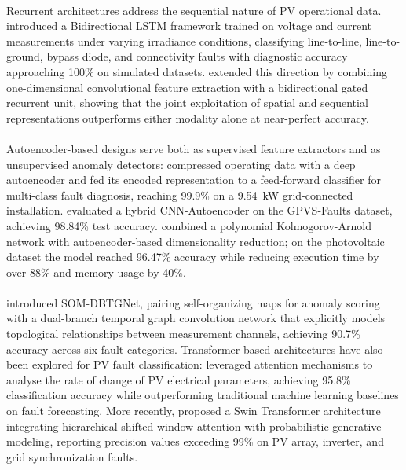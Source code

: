\paragraph{}
Recurrent architectures address the sequential nature of PV operational data. \citet{hajji2023irradiance} introduced a Bidirectional LSTM framework trained on voltage and current measurements under varying irradiance conditions, classifying line-to-line, line-to-ground, bypass diode, and connectivity faults with diagnostic accuracy approaching 100\% on simulated datasets. \citet{amiri2024dl} extended this direction by combining one-dimensional convolutional feature extraction with a bidirectional gated recurrent unit, showing that the joint exploitation of spatial and sequential representations outperforms either modality alone at near-perfect accuracy.

\paragraph{}
Autoencoder-based designs serve both as supervised feature extractors and as unsupervised anomaly detectors: \citet{seghiour2023autoencoder} compressed operating data with a deep autoencoder and fed its encoded representation to a feed-forward classifier for multi-class fault diagnosis, reaching 99.9\% on a 9.54~kW grid-connected installation. \citet{titouni_hybrid_2025} evaluated a hybrid CNN-Autoencoder on the GPVS-Faults dataset, achieving 98.84\% test accuracy. \citet{attouri_adaptive_2026} combined a polynomial Kolmogorov-Arnold network with autoencoder-based dimensionality reduction; on the photovoltaic dataset the model reached 96.47\% accuracy while reducing execution time by over 88\% and memory usage by 40\%.

\paragraph{}
\citet{yan_som-dbtgnet_2025} introduced SOM-DBTGNet, pairing self-organizing maps for anomaly scoring with a dual-branch temporal graph convolution network that explicitly models topological relationships between measurement channels, achieving 90.7\% accuracy across six fault categories. Transformer-based architectures have also been explored for PV fault classification: \citet{khalil2024transformer} leveraged attention mechanisms to analyse the rate of change of PV electrical parameters, achieving 95.8\% classification accuracy while outperforming traditional machine learning baselines on fault forecasting. More recently, \citet{balachandran2025solarfaultnet} proposed a Swin Transformer architecture integrating hierarchical shifted-window attention with probabilistic generative modeling, reporting precision values exceeding 99\% on PV array, inverter, and grid synchronization faults.

